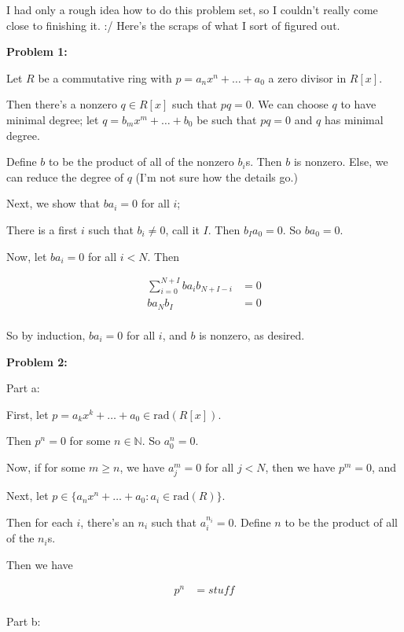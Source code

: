 \documentclass[a4paper,12pt]{article}
\newcommand{\tab}{\hspace{4mm}} %
\newcommand{\shunt}{\vspace{20mm}}
\newcommand{\N}{\mathbb{N}}
\begin{document}
I had only a rough idea how to do this problem set, so I couldn't really come close to finishing it. :/ Here's the scraps of what I sort of figured out.

{\bf Problem 1:} 

Let $R$ be a commutative ring with $p = a_nx^n + \ldots + a_0$ a zero divisor in $R[x]$.

Then there's a nonzero $q \in R[x]$ such that $pq=0$. We can choose $q$ to have minimal degree; let $q=b_mx^m+ \ldots +b_0$ be such that $pq=0$ and $q$ has minimal degree.

Define $b$ to be the product of all of the nonzero $b_i$s. Then $b$ is nonzero. Else, we can reduce the degree of $q$ (I'm not sure how the details go.)

Next, we show that $ba_i=0$ for all $i$;

\tab There is a first $i$ such that $b_i \neq 0$, call it $I$. Then $b_Ia_0=0$. So $ba_0=0$.

\tab Now, let $ba_i=0$ for all $i < N$. Then %

\begin{align*}
\sum\limits_{i=0}^{N+I} ba_ib_{N+I-i} &=0\\
ba_Nb_I &=0\\
\end{align*}

So by induction, $ba_i=0$ for all $i$, and $b$ is nonzero, as desired.

\shunt

{\bf Problem 2:}

Part a:

First, let $p = a_kx^k+ \ldots +a_0 \in \text{rad}(R[x])$.

\tab Then $p^n = 0$ for some $n \in \N$. So $a_0^n=0$.

\tab Now, if for some $m\geq n$, we have $a_j^m=0$ for all $j<N$, then we have $p^m = 0$, and %

Next, let $p \in \{a_nx^n + \ldots + a_0: a_i \in \text{rad}(R)\}$.

\tab Then for each $i$, there's an $n_i$ such that $a_i^{n_i}=0$. Define $n$ to be the product of all of the $n_i$s.

\tab Then we have

\begin{align*}
p^n&=stuff\\
\end{align*}

\shunt 

Part b:
\end{document}
